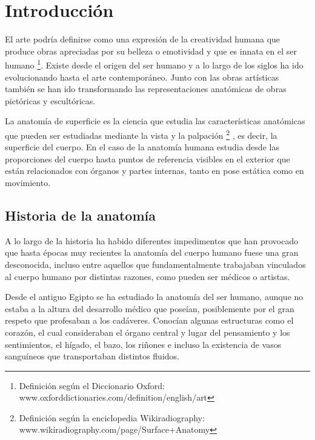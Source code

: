 \section{Introducción} %
El arte podría definirse como una expresión de la creatividad humana que produce obras apreciadas por su belleza o emotividad y que es innata en el ser humano \footnote{Definición según el Diccionario Oxford: www.oxforddictionaries.com/definition/english/art}. Existe desde el origen del ser humano y  %
a lo largo de los siglos ha ido evolucionando hasta el arte contemporáneo. Junto con las obras artísticas también se han ido transformando las representaciones anatómicas de obras pictóricas y escultóricas.

La anatomía de superficie es la ciencia que estudia las características anatómicas que pueden ser estudiadas mediante la vista y la palpación \footnote{Definición según la enciclopedia Wikiradiography: www.wikiradiography.com/page/Surface+Anatomy}%
, es decir, la superficie del cuerpo. En el caso de la anatomía humana estudia desde las proporciones del cuerpo hasta puntos de referencia visibles en el exterior que están relacionados con órganos y partes internas, tanto en pose estática como en movimiento. %

\subsection{Historia de la anatomía}
A lo largo de la historia ha habido diferentes impedimentos que han provocado que hasta épocas muy recientes la anatomía del cuerpo humano fuese una gran desconocida, incluso entre aquellos que fundamentalmente trabajaban vinculados al cuerpo humano por distintas razones, como pueden ser médicos o artistas.

Desde el antiguo Egipto se ha estudiado la anatomía del ser humano, aunque no estaba a la altura del desarrollo médico que poseían, posiblemente por el gran respeto que profesaban a los cadáveres. Conocían algunas estructuras como el corazón, el cual consideraban el órgano central y lugar del pensamiento y los sentimientos, el hígado, el bazo, los riñones e incluso la existencia de vasos sanguíneos que transportaban distintos fluidos.

